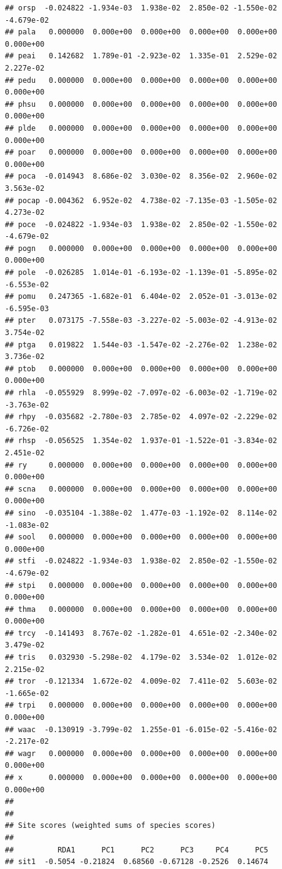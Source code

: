 \documentclass[
]{article}
\begin{document}
\begin{verbatim}
## orsp  -0.024822 -1.934e-03  1.938e-02  2.850e-02 -1.550e-02 -4.679e-02
## pala   0.000000  0.000e+00  0.000e+00  0.000e+00  0.000e+00  0.000e+00
## peai   0.142682  1.789e-01 -2.923e-02  1.335e-01  2.529e-02  2.227e-02
## pedu   0.000000  0.000e+00  0.000e+00  0.000e+00  0.000e+00  0.000e+00
## phsu   0.000000  0.000e+00  0.000e+00  0.000e+00  0.000e+00  0.000e+00
## plde   0.000000  0.000e+00  0.000e+00  0.000e+00  0.000e+00  0.000e+00
## poar   0.000000  0.000e+00  0.000e+00  0.000e+00  0.000e+00  0.000e+00
## poca  -0.014943  8.686e-02  3.030e-02  8.356e-02  2.960e-02  3.563e-02
## pocap -0.004362  6.952e-02  4.738e-02 -7.135e-03 -1.505e-02  4.273e-02
## poce  -0.024822 -1.934e-03  1.938e-02  2.850e-02 -1.550e-02 -4.679e-02
## pogn   0.000000  0.000e+00  0.000e+00  0.000e+00  0.000e+00  0.000e+00
## pole  -0.026285  1.014e-01 -6.193e-02 -1.139e-01 -5.895e-02 -6.553e-02
## pomu   0.247365 -1.682e-01  6.404e-02  2.052e-01 -3.013e-02 -6.595e-03
## pter   0.073175 -7.558e-03 -3.227e-02 -5.003e-02 -4.913e-02  3.754e-02
## ptga   0.019822  1.544e-03 -1.547e-02 -2.276e-02  1.238e-02  3.736e-02
## ptob   0.000000  0.000e+00  0.000e+00  0.000e+00  0.000e+00  0.000e+00
## rhla  -0.055929  8.999e-02 -7.097e-02 -6.003e-02 -1.719e-02 -3.763e-02
## rhpy  -0.035682 -2.780e-03  2.785e-02  4.097e-02 -2.229e-02 -6.726e-02
## rhsp  -0.056525  1.354e-02  1.937e-01 -1.522e-01 -3.834e-02  2.451e-02
## ry     0.000000  0.000e+00  0.000e+00  0.000e+00  0.000e+00  0.000e+00
## scna   0.000000  0.000e+00  0.000e+00  0.000e+00  0.000e+00  0.000e+00
## sino  -0.035104 -1.388e-02  1.477e-03 -1.192e-02  8.114e-02 -1.083e-02
## sool   0.000000  0.000e+00  0.000e+00  0.000e+00  0.000e+00  0.000e+00
## stfi  -0.024822 -1.934e-03  1.938e-02  2.850e-02 -1.550e-02 -4.679e-02
## stpi   0.000000  0.000e+00  0.000e+00  0.000e+00  0.000e+00  0.000e+00
## thma   0.000000  0.000e+00  0.000e+00  0.000e+00  0.000e+00  0.000e+00
## trcy  -0.141493  8.767e-02 -1.282e-01  4.651e-02 -2.340e-02  3.479e-02
## tris   0.032930 -5.298e-02  4.179e-02  3.534e-02  1.012e-02  2.215e-02
## tror  -0.121334  1.672e-02  4.009e-02  7.411e-02  5.603e-02 -1.665e-02
## trpi   0.000000  0.000e+00  0.000e+00  0.000e+00  0.000e+00  0.000e+00
## waac  -0.130919 -3.799e-02  1.255e-01 -6.015e-02 -5.416e-02 -2.217e-02
## wagr   0.000000  0.000e+00  0.000e+00  0.000e+00  0.000e+00  0.000e+00
## x      0.000000  0.000e+00  0.000e+00  0.000e+00  0.000e+00  0.000e+00
## 
## 
## Site scores (weighted sums of species scores)
## 
##          RDA1      PC1      PC2      PC3     PC4      PC5
## sit1  -0.5054 -0.21824  0.68560 -0.67128 -0.2526  0.14674

\end{verbatim}
\end{document}
